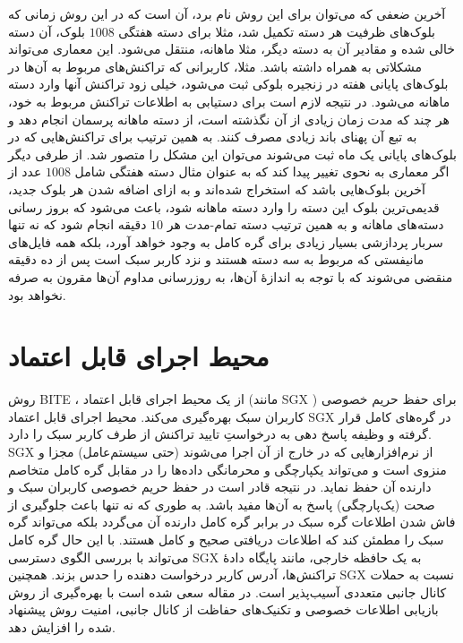 آخرین ضعفی که می‌توان برای این روش \cite{Qin2019} نام برد، آن است که در این روش زمانی که بلوک‌های ظرفیت هر دسته تکمیل شد، مثلا برای دسته هفتگی $1008$ بلوک، آن دسته خالی شده و مقادیر آن به دسته دیگر، مثلا ماهانه، منتقل می‌شود. این معماری می‌تواند مشکلاتی به همراه داشته باشد. مثلا، کاربرانی که تراکنش‌های مربوط به آن‌ها در بلوک‌های پایانی هفته در زنجیره بلوکی ثبت می‌شود، خیلی زود تراکنش آنها وارد دسته ماهانه می‌شود. در نتیجه لازم است برای دستیابی به اطلاعات تراکنش مربوط به خود، هر چند که مدت زمان زیادی از آن نگذشته است، از دسته ماهانه پرسمان انجام دهد و به تبع آن پهنای باند زیادی مصرف کنند. به همین ترتیب برای تراکنش‌هایی که در بلوک‌های پایانی یک ماه ثبت می‌شوند می‌توان این مشکل را متصور شد. از طرفی دیگر اگر معماری به نحوی تغییر پیدا کند که به عنوان مثال دسته هفتگی شامل $1008$ عدد از آخرین بلوک‌هایی باشد که استخراج شده‌اند و به ازای اضافه شدن هر بلوک جدید، قدیمی‌ترین بلوک این دسته را وارد دسته ماهانه شود، باعث می‌شود که بروز رسانی دسته‌های ماهانه و به همین ترتیب دسته تمام-مدت هر $10$ دقیقه انجام شود که نه تنها سربار پردازشی بسیار زیادی برای گره کامل به وجود خواهد آورد، بلکه همه فایل‌های مانیفستی که مربوط به سه دسته هستند و نزد کاربر سبک است پس از ده دقیقه منقضی می‌شوند که با توجه به اندازه‌ٔ آن‌ها، به روزرسانی مداوم آن‌ها مقرون به صرفه نخواهد بود.

\section{محیط اجرای قابل اعتماد}
\label{SGX}

روش BITE
\cite{Matetic2019}
، از یک محیط اجرای قابل اعتماد (مانند 
SGX
\cite{SGX})
برای حفظ حریم خصوصی کاربران سبک بهره‌گیری می‌کند. 
محیط اجرای قابل اعتماد SGX در گره‌های کامل قرار گرفته و وظیفه پاسخ دهی به درخواستِ تایید تراکنش از طرف کاربر سبک را دارد. SGX از نرم‌افزارهایی که در خارج از آن اجرا می‌شوند (حتی سیستم‌عامل) مجزا و منزوی است و می‌تواند یکپارچگی و محرمانگی داده‌ها را در مقابل گره کامل متخاصم دارنده آن حفظ نماید. در نتیجه قادر است در حفظ حریم خصوصی کاربران سبک و صحت (یک‌پارچگی) پاسخ‌ به آن‌‌ها مفید باشد. به طوری که نه تنها باعث جلوگیری از فاش شدن اطلاعات گره سبک در برابر گره کامل دارنده آن می‌گردد بلکه می‌تواند گره سبک را مطمئن کند که اطلاعات دریافتی صحیح و کامل هستند. با این حال گره کامل می‌تواند با بررسی الگوی دسترسی SGX به یک حافظه خارجی،‌ مانند پایگاه‌ دادهٔ‌ تراکنش‌ها، آدرس کاربر درخواست دهنده را حدس بزند. همچنین SGX نسبت به حملات کانال جانبی متعددی آسیب‌پذیر است. در مقاله \cite{Matetic2019} سعی شده است با بهره‌گیری از روش بازیابی اطلاعات خصوصی و تکنیک‌های حفاظت از کانال جانبی، امنیت روش پیشنهاد شده را افزایش دهد.

